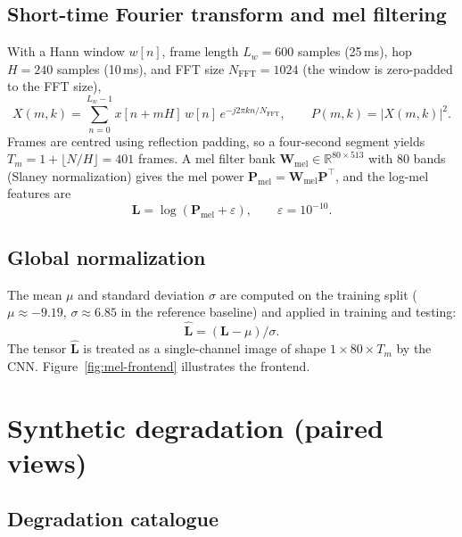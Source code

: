 \subsection{Short-time Fourier transform and mel filtering}

With a Hann window $w[n]$, frame length $L_w = 600$ samples (25\,ms), hop $H = 240$ samples (10\,ms), and FFT size $N_{\mathrm{FFT}} = 1024$ (the window is zero-padded to the FFT size),
\begin{equation}
X(m,k) = \sum_{n=0}^{L_w-1} x[n + mH]\, w[n]\, e^{-j2\pi kn / N_{\mathrm{FFT}}}, \qquad P(m,k) = |X(m,k)|^2 .
\label{eq:stft}
\end{equation}
Frames are centred using reflection padding, so a four-second segment yields $T_m = 1 + \lfloor N/H \rfloor = 401$ frames. A mel filter bank $\mathbf{W}_{\mathrm{mel}} \in \mathbb{R}^{80 \times 513}$ with 80 bands (Slaney normalization) gives the mel power $\mathbf{P}_{\mathrm{mel}} = \mathbf{W}_{\mathrm{mel}} \mathbf{P}^{\top}$, and the log-mel features are
\begin{equation}
\mathbf{L} = \log(\mathbf{P}_{\mathrm{mel}} + \varepsilon), \qquad \varepsilon = 10^{-10}.
\label{eq:logmel}
\end{equation}

\subsection{Global normalization}

The mean $\mu$ and standard deviation $\sigma$ are computed on the training split ($\mu \approx -9.19$, $\sigma \approx 6.85$ in the reference baseline) and applied in training and testing:
\begin{equation}
\hat{\mathbf{L}} = (\mathbf{L} - \mu) / \sigma .
\label{eq:norm}
\end{equation}
The tensor $\hat{\mathbf{L}}$ is treated as a single-channel image of shape $1 \times 80 \times T_m$ by the CNN. Figure~\ref{fig:mel-frontend} illustrates the frontend.



\section{Synthetic degradation (paired views)}
\label{sec:degradation}

\subsection{Degradation catalogue}

